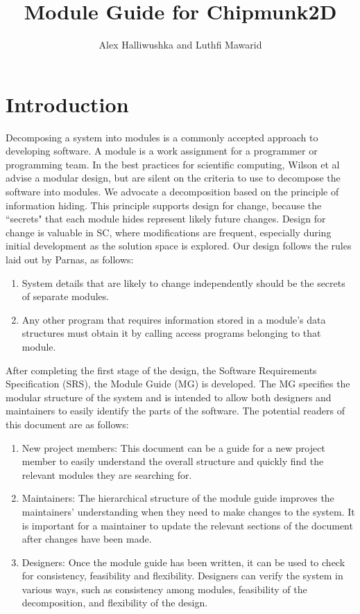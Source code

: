 \documentclass[12pt]{article}
\title{Module Guide for Chipmunk2D}
\author{Alex Halliwushka and Luthfi Mawarid}
\begin{document}
\maketitle
\tableofcontents
\newpage
\section{Introduction}
\label{Sec:I}
Decomposing a system into modules is a commonly accepted approach to developing software.  A module is a work assignment for a programmer or programming team. In the best practices for scientific computing, Wilson et al advise a modular design, but are silent on the criteria to use to decompose the software into modules.  We advocate a decomposition based on the principle of information hiding. This principle supports design for change, because the ``secrets" that each module hides represent likely future changes.  Design for change is valuable in SC, where modifications are frequent, especially during initial development as the solution space is explored.
Our design follows the rules laid out by Parnas, as follows:
\begin{enumerate}
\item{System details that are likely to change independently should be the secrets of separate modules.}
\item{Any other program that requires information stored in a module's data structures must obtain it by calling access programs belonging to that module.}
\end{enumerate}
After completing the first stage of the design, the Software Requirements Specification (SRS), the Module Guide (MG) is developed. The MG specifies the modular structure of the system and is intended to allow both designers and maintainers to easily identify the parts of the software.  The potential readers of this document are as follows:
\begin{enumerate}
\item{New project members: This document can be a guide for a new project member to easily understand the overall structure and quickly find the relevant modules they are searching for.}
\item{Maintainers: The hierarchical structure of the module guide improves the maintainers' understanding when they need to make changes to the system. It is important for a maintainer to update the relevant sections of the document after changes have been made.}
\item{Designers: Once the module guide has been written, it can be used to check for consistency, feasibility and flexibility. Designers can verify the system in various ways, such as consistency among modules, feasibility of the decomposition, and flexibility of the design.}
\end{enumerate}
\end{document}
